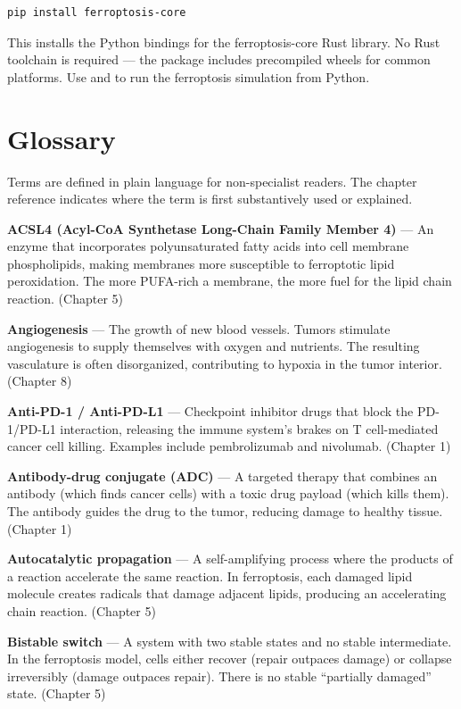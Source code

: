 \documentclass[11pt,twoside,openright]{report}
\begin{document}
\begin{bookterminal}
\begin{verbatim}
pip install ferroptosis-core
\end{verbatim}
\end{bookterminal}

This installs the Python bindings for the ferroptosis-core Rust library. No Rust toolchain is required --- the package includes precompiled wheels for common platforms. Use  and  to run the ferroptosis simulation from Python.
\dinkus
\chapter{Glossary}

Terms are defined in plain language for non-specialist readers. The chapter reference indicates where the term is first substantively used or explained.

\textbf{ACSL4 (Acyl-CoA Synthetase Long-Chain Family Member 4)} --- An enzyme that incorporates polyunsaturated fatty acids into cell membrane phospholipids, making membranes more susceptible to ferroptotic lipid peroxidation. The more PUFA-rich a membrane, the more fuel for the lipid chain reaction. (Chapter 5)

\textbf{Angiogenesis} --- The growth of new blood vessels. Tumors stimulate angiogenesis to supply themselves with oxygen and nutrients. The resulting vasculature is often disorganized, contributing to hypoxia in the tumor interior. (Chapter 8)

\textbf{Anti-PD-1 / Anti-PD-L1} --- Checkpoint inhibitor drugs that block the PD-1/PD-L1 interaction, releasing the immune system's brakes on T cell-mediated cancer cell killing. Examples include pembrolizumab and nivolumab. (Chapter 1)

\textbf{Antibody-drug conjugate (ADC)} --- A targeted therapy that combines an antibody (which finds cancer cells) with a toxic drug payload (which kills them). The antibody guides the drug to the tumor, reducing damage to healthy tissue. (Chapter 1)

\textbf{Autocatalytic propagation} --- A self-amplifying process where the products of a reaction accelerate the same reaction. In ferroptosis, each damaged lipid molecule creates radicals that damage adjacent lipids, producing an accelerating chain reaction. (Chapter 5)

\textbf{Bistable switch} --- A system with two stable states and no stable intermediate. In the ferroptosis model, cells either recover (repair outpaces damage) or collapse irreversibly (damage outpaces repair). There is no stable ``partially damaged'' state. (Chapter 5)
\end{document}
